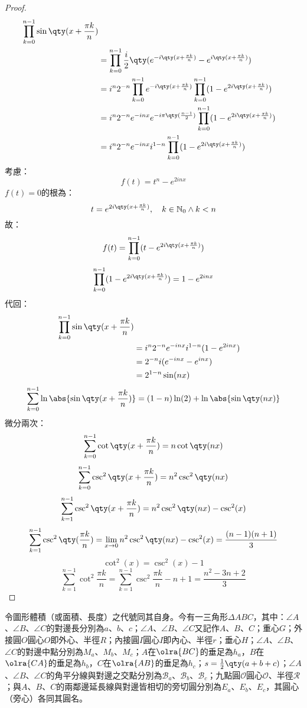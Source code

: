 \documentclass[a4paper,12pt]{report}
\begin{document}
\begin{proof}
\[\begin{aligned}
\prod_{k=0}^{n-1}\sin\qty(x+\frac{\pi k}{n})\\
&=\prod_{k=0}^{n-1}\frac{i}{2}\qty(e^{-i\qty(x+\frac{\pi k}{n})}-e^{i\qty(x+\frac{\pi k}{n})})\\
&=i^n2^{-n}\prod_{k=0}^{n-1}e^{-i\qty(x+\frac{\pi k}{n})}\prod_{k=0}^{n-1}(1-e^{2i\qty(x+\frac{\pi k}{n})})\\
&=i^n2^{-n}e^{-inx}e^{-i\pi\qty(\frac{n-1}{2})}
\prod_{k=0}^{n-1}(1-e^{2i\qty(x+\frac{\pi k}{n})})\\
&=i^n2^{-n}e^{-inx}i^{1-n}\prod_{k=0}^{n-1}(1-e^{2i\qty(x+\frac{\pi k}{n})})
\end{aligned}\]
考慮：
\[f(t)=t^n-e^{2inx}\]
$f(t)=0$的根為：
\[t=e^{2i\qty(x+\frac{\pi k}{n})},\quad k\in\mathbb{N}_0\land k<n\]
故：
\[f(t)=\prod_{k=0}^{n-1}(t-e^{2i\qty(x+\frac{\pi k}{n})})\]
\[\prod_{k=0}^{n-1}(1-e^{2i\qty(x+\frac{\pi k}{n})})=1-e^{2inx}\]
代回：
\[\begin{aligned}
\prod_{k=0}^{n-1}\sin\qty(x+\frac{\pi k}{n})\\
&=i^n2^{-n}e^{-inx}i^{1-n}(1-e^{2inx})\\
&=2^{-n}i(e^{-inx}-e^{inx})\\
&=2^{1-n}\sin(nx)
\end{aligned}\]
\[\sum_{k=0}^{n-1}\ln\abs{\sin\qty(x+\frac{\pi k}{n})}=(1-n)\ln(2)+\ln\abs{\sin\qty(nx)}\]
微分兩次：
\[\sum_{k=0}^{n-1}\cot\qty(x+\frac{\pi k}{n})=n\cot\qty(nx)\]
\[\sum_{k=0}^{n-1}\csc^2\qty(x+\frac{\pi k}{n})=n^2\csc^2\qty(nx)\]
\[\sum_{k=1}^{n-1}\csc^2\qty(x+\frac{\pi k}{n})=n^2\csc^2\qty(nx)-\csc^2(x)\]
\[\sum_{k=1}^{n-1}\csc^2\qty(\frac{\pi k}{n})=\lim_{x\to 0}n^2\csc^2\qty(nx)-\csc^2(x)=\frac{(n-1)(n+1)}{3}\]
\[\cot^2(x)=\csc^2(x)-1\]
\[\sum_{k=1}^{n-1}\cot^2\frac{\pi k}{n}=\sum_{k=1}^{n-1}\csc^2\frac{\pi k}{n}-n+1=\frac{n^2-3n+2}{3}\]
\end{proof}
令圖形體積（或面積、長度）之代號同其自身。今有一三角形$\Delta ABC$，其中：$\angle A$、$\angle B$、$\angle C$的對邊長分別為$a$、$b$、$c$；$\angle A$、$\angle B$、$\angle C$又記作$A$、$B$、$C$；重心$G$；外接圓$O$圓心$O$即外心、半徑$R$；內接圓$I$圓心$I$即內心、半徑$r$；垂心$H$；$\angle A$、$\angle B$、$\angle C$的對邊中點分別為$M_a$、$M_b$、$M_c$；$A$在$\olra{BC}$的垂足為$h_a$，$B$在$\olra{CA}$的垂足為$h_b$，$C$在$\olra{AB}$的垂足為$h_c$；$s=\frac{1}{2}\qty(a+b+c)$；$\angle A$、$\angle B$、$\angle C$的角平分線與對邊之交點分別為$\mathscr{B}_a$、$\mathscr{B}_b$、$\mathscr{B}_c$；九點圓$\mathscr{O}$圓心$\mathscr{O}$、半徑$\mathscr{R}$；與$A$、$B$、$C$的兩鄰邊延長線與對邊皆相切的旁切圓分別為$E_a$、$E_b$、$E_c$，其圓心（旁心）各同其圓名。
\end{document}
